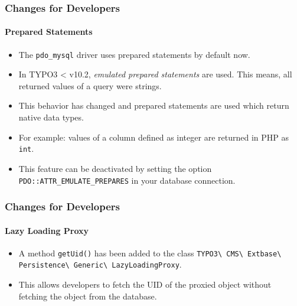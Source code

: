 \begin{frame}[fragile]
	\frametitle{Changes for Developers}
	\framesubtitle{Prepared Statements}

	\lstset{basicstyle=\tiny\ttfamily}

	\begin{itemize}
		\item The \texttt{pdo\_mysql} driver uses prepared statements by default now.
		\item In TYPO3 < v10.2, \textit{emulated prepared statements} are used.
			This means, all returned values of a query were strings.
		\item This behavior has changed and prepared statements are used
			which return native data types.
		\item For example: values of a column defined as integer are returned in PHP as \texttt{int}.
		\item This feature can be deactivated by setting the option
			\texttt{PDO::ATTR\_EMULATE\_PREPARES} in your database connection.

	\end{itemize}

\end{frame}


\begin{frame}[fragile]
	\frametitle{Changes for Developers}
	\framesubtitle{Lazy Loading Proxy}

	\lstset{basicstyle=\tiny\ttfamily}

	\begin{itemize}
		\item A method \texttt{getUid()} has been added to the class\newline
			\texttt{TYPO3\textbackslash
				CMS\textbackslash
				Extbase\textbackslash
				Persistence\textbackslash
				Generic\textbackslash
				LazyLoadingProxy}.
		\item This allows developers to fetch the UID of the proxied object without fetching the object from the database.

	\end{itemize}

\end{frame}


